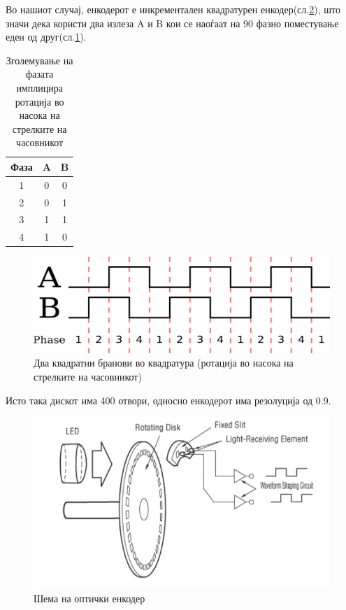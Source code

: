 \documentclass[12pt]{article}
\begin{document}
		Во нашиот случај, енкодерот е инкрементален квадратурен енкодер(сл.\ref{fig:encoder.png}), што значи дека користи два излеза A и B кои се наоѓаат на 90 \degree фазно поместување еден од друг(сл.\ref{fig:encoder_quadrature.png}).

		\begin{table}[h]
			\caption{Зголемување на фазата имплицира ротација во насока на стрелките на часовникот}
			\label{tab:fazno}

			\begin{center}
				\begin{tabular}{||c|c|c||}
					\hline
					Фаза & A & B \\
					\hline \hline
					1 & 0 & 0 \\
					\hline
					2 & 0 & 1 \\
					\hline
					3 & 1 & 1 \\
					\hline
					4 & 1 & 0 \\
					\hline
				\end{tabular}
			\end{center}
			\end{table}

    \begin{figure}[H]
			\includegraphics[width=0.5\linewidth]{./images/encoder_quadrature.png}
			\centering
			\caption{Два квадратни бранови во квадратура (ротација во насока на стрелките на часовникот)}
			\label{fig:encoder_quadrature.png}
			\end{figure}

    Исто така дискот има 400 отвори, односно енкодерот има резолуција од 0.9\degree.

    \begin{figure}[H]
			\includegraphics[width=0.5\linewidth]{./images/encoder.png}
			\centering
			\caption{Шема на оптички енкодер}
			\label{fig:encoder.png}
		  \end{figure}
\end{document}
